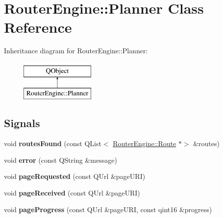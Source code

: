 \hypertarget{classRouterEngine_1_1Planner}{}\section{Router\+Engine\+:\+:Planner Class Reference}
\label{classRouterEngine_1_1Planner}
Inheritance diagram for Router\+Engine\+:\+:Planner\+:\begin{figure}[H]
\begin{center}
\leavevmode
\includegraphics[height=2.000000cm]{classRouterEngine_1_1Planner}
\end{center}
\end{figure}
\subsection*{Signals}
\begin{DoxyCompactItemize}
\item 
\mbox{\label{classRouterEngine_1_1Planner_a5c655efeb575e8842cf20bdd16fc025e}} 
void {\bfseries routes\+Found} (const Q\+List$<$ \mbox{\hyperlink{classRouterEngine_1_1Route}{Router\+Engine\+::\+Route}} $\ast$$>$ \&routes)
\item 
\mbox{\label{classRouterEngine_1_1Planner_a26d92d9ae44cdffae0e3b37765b1708e}} 
void {\bfseries error} (const Q\+String \&message)
\item 
\mbox{\label{classRouterEngine_1_1Planner_ab4a2c861d1ed9561499a7036b809eb94}} 
void {\bfseries page\+Requested} (const Q\+Url \&page\+U\+RI)
\item 
\mbox{\label{classRouterEngine_1_1Planner_a081f70dd778700e47328330acffdbd6b}} 
void {\bfseries page\+Received} (const Q\+Url \&page\+U\+RI)
\item 
\mbox{\label{classRouterEngine_1_1Planner_a64a706ca570771d9d9967a5288721219}} 
void {\bfseries page\+Progress} (const Q\+Url \&page\+U\+RI, const qint16 \&progress)
\end{DoxyCompactItemize}
